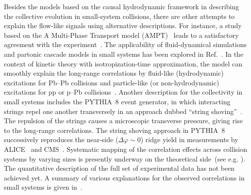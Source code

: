 Besides the models based on the causal hydrodynamic framework in describing the collective evolution in small-system collisions, there are other attempts to explain the flow-like signals using alternative descriptions. For instance, a study based on the A Multi-Phase Transport model (AMPT)~\cite{Lin:2004en} leads to a satisfactory agreement with the experiment~\cite{OrjuelaKoop:2015jss}. The applicability of fluid-dynamical simulations and partonic cascade models in small systems has been explored in Ref.~\cite{Gallmeister:2018mcn}. In the context of kinetic theory with isotropization-time approximation, the model can smoothly explain the long-range correlations by fluid-like (hydrodynamic) excitations for Pb--Pb collisions and particle-like (or non-hydrodynamic) excitations for pp or p--Pb collisions~\cite{Kurkela:2019kip,Kurkela:2020wwb,Ambrus:2021fej}. Another description for the collectivity in small systems includes the PYTHIA~8 event generator, in which interacting strings repel one another transversely in an approach dubbed ``string shoving''~\cite{Bierlich:2017vhg,Bierlich:2019ixq}. The repulsion of the strings causes a microscopic transverse pressure, giving rise to the long-range correlations. The string shoving approach in PYTHIA~8 successively reproduces the near-side ($\Delta\varphi\sim0$) ridge yield in measurements by ALICE~\cite{ALICE:2021nir} and CMS~\cite{Khachatryan:2016txc}. Systematic mapping of the correlation effects across collision systems by varying sizes is presently underway on the theoretical side~(see e.g. \cite{Schenke:2020mbo}). The quantitative description of the full set of experimental data has not been achieved yet. A summary of various explanations for the observed correlations in small systems is given in~\cite{Strickland:2018exs,Loizides:2016tew,Nagle:2018nvi}. 








